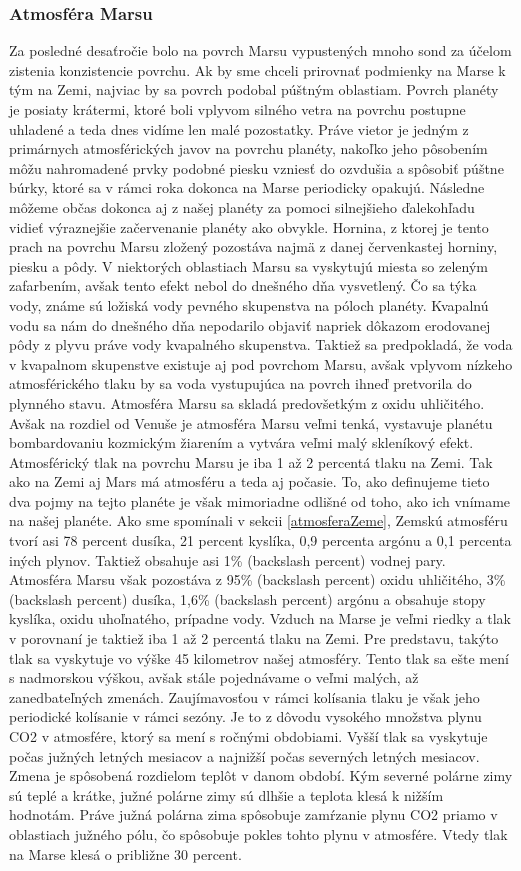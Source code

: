 \subsubsection{Atmosféra Marsu}
\label{atmosferaMarsu}
Za posledné desaťročie bolo na povrch Marsu vypustených mnoho sond za účelom zistenia konzistencie povrchu. Ak by sme chceli prirovnať podmienky na Marse k tým na Zemi, najviac by sa povrch podobal púštným oblastiam. Povrch planéty je posiaty krátermi, ktoré boli vplyvom silného vetra na povrchu postupne uhladené a teda dnes vidíme len malé pozostatky. Práve vietor je jedným z primárnych atmosférických javov na povrchu planéty, nakoľko jeho pôsobením môžu nahromadené prvky podobné piesku vzniesť do ozvdušia a spôsobiť púštne búrky, ktoré sa v rámci roka dokonca na Marse periodicky opakujú. Následne môžeme občas dokonca aj z našej planéty za pomoci silnejšieho ďalekohľadu vidieť výraznejšie začervenanie planéty ako obvykle. Hornina, z ktorej je tento prach na povrchu Marsu zložený pozostáva najmä z danej červenkastej horniny, piesku a pôdy. V niektorých oblastiach Marsu sa vyskytujú miesta so zeleným zafarbením, avšak tento efekt nebol do dnešného dňa vysvetlený. Čo sa týka vody, známe sú ložiská vody pevného skupenstva na póloch planéty. Kvapalnú vodu sa nám do dnešného dňa nepodarilo objaviť napriek dôkazom erodovanej pôdy z plyvu práve vody kvapalného skupenstva. Taktiež sa predpokladá, že voda v kvapalnom skupenstve existuje aj pod povrchom Marsu, avšak vplyvom nízkeho atmosférického tlaku by sa voda vystupujúca na povrch ihneď pretvorila do plynného stavu. 
Atmosféra Marsu sa skladá predovšetkým z oxidu uhličitého. Avšak na rozdiel od Venuše je atmosféra Marsu veľmi tenká, vystavuje planétu bombardovaniu kozmickým žiarením a vytvára veľmi malý skleníkový efekt. Atmosférický tlak na povrchu Marsu je iba 1 až 2 percentá tlaku na Zemi. 
Tak ako na Zemi aj Mars má atmosféru a teda aj počasie. To, ako definujeme tieto dva pojmy na tejto planéte je však mimoriadne odlišné od toho, ako ich vnímame na našej planéte. Ako sme spomínali v sekcii \ref{atmosferaZeme}, Zemskú atmosféru tvorí asi 78 percent dusíka, 21 percent kyslíka, 0,9 percenta argónu a 0,1 percenta iných plynov. Taktiež obsahuje asi 1\% (backslash percent) vodnej pary. Atmosféra Marsu však pozostáva z 95\% (backslash percent) oxidu uhličitého, 3\% (backslash percent) dusíka, 1,6\% (backslash percent) argónu a obsahuje stopy kyslíka, oxidu uhoľnatého, prípadne vody. Vzduch na Marse je veľmi riedky a tlak v porovnaní je taktiež iba 1 až 2 percentá tlaku na Zemi. Pre predstavu, takýto tlak sa vyskytuje vo výške 45 kilometrov našej atmosféry. Tento tlak sa ešte mení s nadmorskou výškou, avšak stále pojednávame o veľmi malých, až zanedbateľných zmenách. Zaujímavosťou v rámci kolísania tlaku je však jeho periodické kolísanie v rámci sezóny. Je to z dôvodu vysokého množstva plynu CO2 v atmosfére, ktorý sa mení s ročnými obdobiami. Vyšší tlak sa vyskytuje počas južných letných mesiacov a najnižší počas severných letných mesiacov. Zmena je spôsobená rozdielom teplôt v danom období. Kým severné polárne zimy sú teplé a krátke, južné polárne zimy sú dlhšie a teplota klesá k nižším hodnotám. Práve južná polárna zima spôsobuje zamŕzanie plynu CO2 priamo v oblastiach južného pólu, čo spôsobuje pokles tohto plynu v atmosfére. Vtedy tlak na Marse klesá o približne 30 percent.
